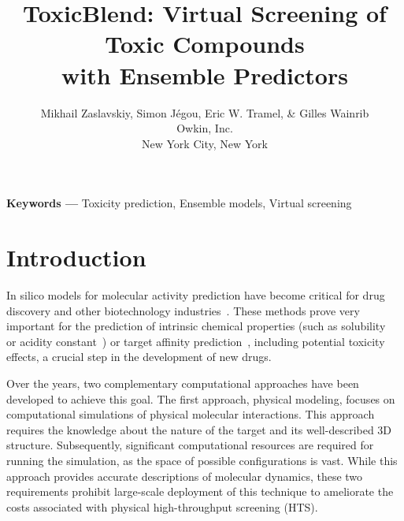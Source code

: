 \documentclass[11pt,a4paper]{article}
\begin{document}
\title{\bfseries ToxicBlend: Virtual Screening of Toxic Compounds \\
                 with Ensemble Predictors}
\author{Mikhail Zaslavskiy, Simon J\'{e}gou, Eric W. Tramel, \& Gilles Wainrib\\ 
        Owkin, Inc. \\
        New York City, New York}
\maketitle


\vspace{4ex}\noindent\textbf{Keywords ---} Toxicity prediction, Ensemble models, Virtual screening 

\section{Introduction}
\label{sec:introduction}

In silico models for molecular activity prediction have become critical for drug
discovery and other biotechnology industries~\cite{Tanrikulu:2013aa}.  These
methods prove very important for the prediction of intrinsic chemical properties
(such as solubility~\cite{Palmer:2007aa} or acidity constant~\cite{Rupp:2011aa})
or target affinity prediction~\cite{Ung:2016aa}, including potential toxicity
effects, a crucial step in the development of new drugs. 


Over the years, two complementary computational approaches have been developed to 
achieve this goal. The first approach, physical modeling, focuses on computational 
simulations of physical molecular interactions. This approach requires the
knowledge about the nature of the target and its well-described 3D 
structure.
Subsequently, significant computational resources are required for running the
simulation, as the space of possible configurations is vast.  While this
approach provides accurate descriptions of molecular dynamics, these two
requirements prohibit large-scale deployment of this technique to ameliorate the
costs associated with physical high-throughput screening (HTS). 
\end{document}
